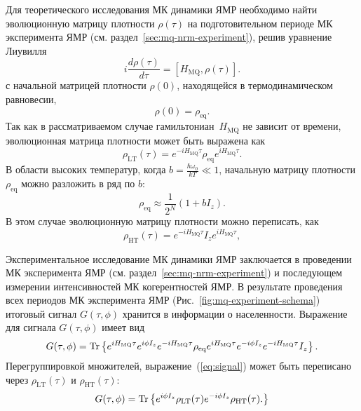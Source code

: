 Для теоретического исследования МК динамики ЯМР
необходимо найти эволюционную матрицу плотности $\rho(\tau)$
на подготовительном периоде МК эксперимента ЯМР (см. раздел~\ref{sec:mq-nrm-experiment}),
решив уравнение Лиувилля~\cite{Feldman2012}
%
\begin{equation}
    \label{eq:liouvile}
    i \dfrac{d\rho(\tau)}{d \tau} =
    \left[H_\mathrm{MQ}, \rho(\tau)\right].
\end{equation}
%
с начальной матрицей плотности $\rho(0)$,
находящейся в термодинамическом равновесии,
%
\begin{equation}
    \label{eq:rho_init}
    \rho(0) = \rho_{\mathrm{eq}}.
\end{equation}
%
Так как в рассматриваемом случае гамильтониан~$H_\mathrm{MQ}$
не зависит от времени,
эволюционная матрица плотности может быть выражена как
\begin{equation}
  \label{eq:rho_eval_lt}
  \rho_\mathrm{LT} (\tau) = e^{-iH_\mathrm{MQ}\tau} \rho_\mathrm{eq} e^{iH_\mathrm{MQ}\tau}.
\end{equation}
В области высоких температур,
когда $b = \frac{\hbar\omega_{0}}{kT} \ll 1$,
начальную матрицу плотности $\rho_{\mathrm{eq}}$ можно разложить в ряд по $b$:
%
\begin{equation}
  \label{eq:rho_ht}
  \rho_{\mathrm{eq}} \approx \dfrac{1}{2^N} (1 + bI_z).
\end{equation}
%
В этом случае эволюционную матрицу плотности можно переписать, как
\begin{equation}\label{eq:rho_eval_ht}
  \rho_\mathrm{HT} (\tau) =  e^{-iH_\mathrm{MQ}\tau} I_z e^{iH_\mathrm{MQ}\tau},
\end{equation}

Экспериментальное исследование МК динамики ЯМР заключается в проведении
МК эксперимента ЯМР (см. раздел~\ref{sec:mq-nrm-experiment})
и последующем измерении интенсивностей МК когерентностей ЯМР.
В результате проведения всех периодов МК эксперимента ЯМР (Рис.~\ref{fig:mq-experiment-schema})
итоговый сигнал $G(\tau, \phi)$ хранится в информации о населенности\cite{Feldman1997}.
Выражение для сигнала $G(\tau, \phi)$ имеет вид
%
\begin{equation}
  \label{eq:signal}
   G(\tau, \phi)
   = \mathrm{Tr} \left\{ 
     e^{iH_\mathrm{MQ}\tau} e^{i\phi I_z} e^{-iH_\mathrm{MQ}\tau}
     \rho_\mathrm{eq}
     e^{iH_\mathrm{MQ}\tau} e^{-i\phi I_z} e^{-iH_\mathrm{MQ}\tau}
     I_z
     \right\}.
\end{equation}
%
Перегруппировкой множителей,
выражение~(\ref{eq:signal}) может быть переписано через
 $\rho_\mathrm{LT} (\tau)$ и $\rho_\mathrm{HT} (\tau)$:
%
\begin{equation}
  \label{eq:signal-short}
  G(\tau, \phi) = \mathrm{Tr} \left\{ 
   e^{i\phi I_z} \rho_\mathrm{LT} (\tau)
   e^{-i\phi I_z} \rho_\mathrm{HT} (\tau).
   \right\}
\end{equation}


